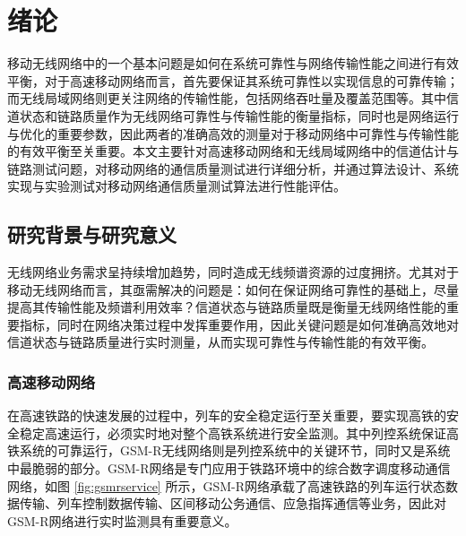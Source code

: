 
\chapter{绪论}
\label{chap:background}

移动无线网络中的一个基本问题是如何在系统可靠性与网络传输性能之间进行有效平衡，对于高速移动网络而言，首先要保证其系统可靠性以实现信息的可靠传输；而无线局域网络则更关注网络的传输性能，包括网络吞吐量及覆盖范围等。其中信道状态和链路质量作为无线网络可靠性与传输性能的衡量指标，同时也是网络运行与优化的重要参数，因此两者的准确高效的测量对于移动网络中可靠性与传输性能的有效平衡至关重要。本文主要针对高速移动网络和无线局域网络中的信道估计与链路测试问题，对移动网络的通信质量测试进行详细分析，并通过算法设计、系统实现与实验测试对移动网络通信质量测试算法进行性能评估。

\section{研究背景与研究意义}
\label{sec:mobile}

无线网络业务需求呈持续增加趋势，同时造成无线频谱资源的过度拥挤。尤其对于移动无线网络而言，其亟需解决的问题是：如何在保证网络可靠性的基础上，尽量提高其传输性能及频谱利用效率？信道状态与链路质量既是衡量无线网络性能的重要指标，同时在网络决策过程中发挥重要作用，因此关键问题是如何准确高效地对信道状态与链路质量进行实时测量，从而实现可靠性与传输性能的有效平衡。

\subsection{高速移动网络}
\label{sec:gsmr}

在高速铁路的快速发展的过程中，列车的安全稳定运行至关重要，要实现高铁的安全稳定高速运行，必须实时地对整个高铁系统进行安全监测。其中列控系统保证高铁系统的可靠运行，GSM-R无线网络则是列控系统中的关键环节，同时又是系统中最脆弱的部分。GSM-R网络是专门应用于铁路环境中的综合数字调度移动通信网络，如图 \ref{fig:gsmrservice} 所示，GSM-R网络承载了高速铁路的列车运行状态数据传输、列车控制数据传输、区间移动公务通信、应急指挥通信等业务，因此对GSM-R网络进行实时监测具有重要意义。

